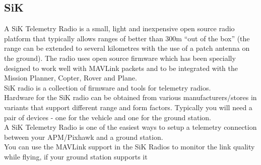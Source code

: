 \subsection{SiK}
A SiK Telemetry Radio is a small, light and inexpensive open source radio platform that typically allows ranges of better than 300m “out of the box” (the range can be extended to several kilometres with the use of a patch antenna on the ground). The radio uses open source firmware which has been specially designed to work well with MAVLink packets and to be integrated with the Mission Planner, Copter, Rover and Plane.\\
SiK radio is a collection of firmware and tools for telemetry radios.\\
Hardware for the SiK radio can be obtained from various manufacturers/stores in variants that support different range and form factors. Typically you will need a pair of devices - one for the vehicle and one for the ground station. \\
A SiK Telemetry Radio is one of the easiest ways to setup a telemetry connection between your APM/Pixhawk and a ground station.\\
You can use the MAVLink support in the SiK Radios to monitor the link quality while flying, if your ground station supports it
%
%
%
%
%
%
